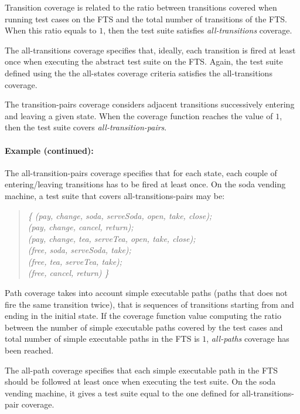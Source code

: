 \begin{definition}
Transition coverage is  related to the ratio between transitions covered when running test cases on the FTS and the total number of transitions of the FTS. When this ratio equals to $1$, then the test suite satisfies \emph{all-transitions} coverage.    
\end{definition}
%
The all-transitions coverage specifies that, ideally, each transition is fired at least once when executing the abstract test suite on the FTS. Again, the test suite defined using the the all-states coverage criteria satisfies the all-transitions coverage.  

\begin{definition}
The tran\-si\-tion-pairs coverage considers adjacent transitions successively entering and leaving a given state. When the coverage function reaches the value of $1$, then the test suite covers \emph{all-transition-pairs}. 
\end{definition}

\paragraph{Example (continued):} 

The all-transition-pairs coverage specifies that for each state, each couple of entering/leaving transitions has to be fired at least once. On the soda vending machine, a test suite that covers all-transitions-pairs may be:
%
\begin{quote}
\textit{ \{ (pay, change, soda, serveSoda, open, take, close); \\
(pay, change, cancel, return);\\
(pay, change, tea, serveTea, open, take, close); \\
(free, soda, serveSoda, take);\\
(free, tea, serveTea, take); \\
(free, cancel, return) \}}
\end{quote}

\begin{definition}
Path coverage takes into account simple executable paths (\ie paths that does not fire the same transition twice), that is sequences of transitions starting from and ending in the initial state. If the coverage function value computing the ratio between the number of  simple executable paths covered by the test cases and total number of simple executable paths in the FTS is $1$, \emph{all-paths} coverage has been reached.  
\end{definition}
%
The all-path coverage specifies that each simple executable path in the FTS should be followed at least once when executing the test suite. On the soda vending machine, it gives a test suite equal to the one defined for all-transitions-pair coverage.


